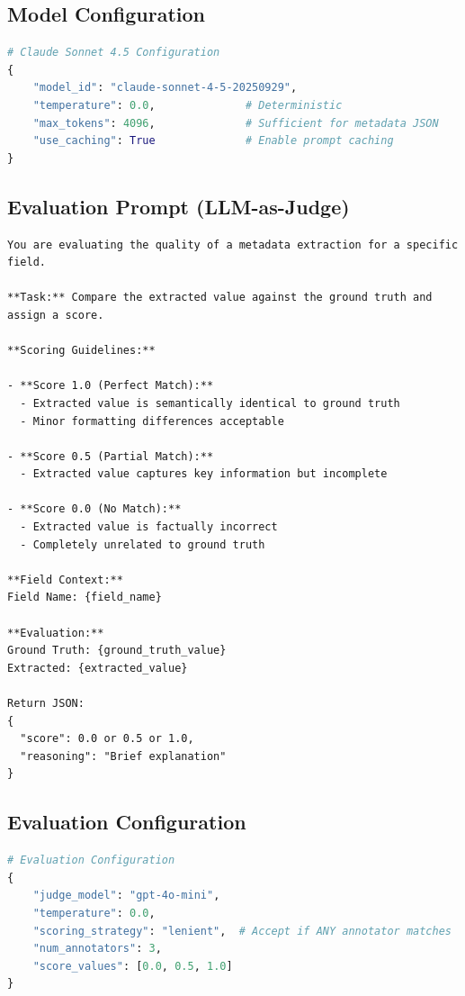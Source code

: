 \documentclass[11pt,a4paper]{article}
\begin{document}
\subsection{Model Configuration}

\begin{lstlisting}[language=Python]
# Claude Sonnet 4.5 Configuration
{
    "model_id": "claude-sonnet-4-5-20250929",
    "temperature": 0.0,              # Deterministic
    "max_tokens": 4096,              # Sufficient for metadata JSON
    "use_caching": True              # Enable prompt caching
}
\end{lstlisting}

\subsection{Evaluation Prompt (LLM-as-Judge)}

\begin{lstlisting}
You are evaluating the quality of a metadata extraction for a specific field.

**Task:** Compare the extracted value against the ground truth and assign a score.

**Scoring Guidelines:**

- **Score 1.0 (Perfect Match):**
  - Extracted value is semantically identical to ground truth
  - Minor formatting differences acceptable

- **Score 0.5 (Partial Match):**
  - Extracted value captures key information but incomplete

- **Score 0.0 (No Match):**
  - Extracted value is factually incorrect
  - Completely unrelated to ground truth

**Field Context:**
Field Name: {field_name}

**Evaluation:**
Ground Truth: {ground_truth_value}
Extracted: {extracted_value}

Return JSON:
{
  "score": 0.0 or 0.5 or 1.0,
  "reasoning": "Brief explanation"
}
\end{lstlisting}

\subsection{Evaluation Configuration}

\begin{lstlisting}[language=Python]
# Evaluation Configuration
{
    "judge_model": "gpt-4o-mini",
    "temperature": 0.0,
    "scoring_strategy": "lenient",  # Accept if ANY annotator matches
    "num_annotators": 3,
    "score_values": [0.0, 0.5, 1.0]
}
\end{lstlisting}
\end{document}
